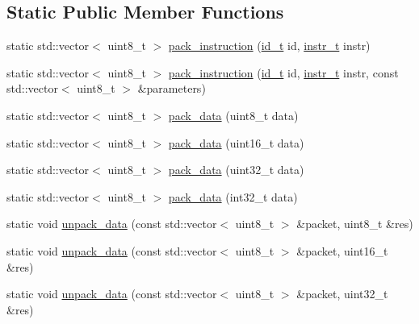 \subsection*{Static Public Member Functions}
\begin{DoxyCompactItemize}
\item 
static std\+::vector$<$ uint8\+\_\+t $>$ \hyperlink{classdynamixel_1_1protocols_1_1_protocol2_a552e41e1a1d4b09a9ecee8828b16054e}{pack\+\_\+instruction} (\hyperlink{classdynamixel_1_1protocols_1_1_protocol2_a38d9cae72cd86213cca74e718c240429}{id\+\_\+t} id, \hyperlink{classdynamixel_1_1protocols_1_1_protocol2_aa7302f20356607bd51e4d4ecf4cb7abf}{instr\+\_\+t} instr)
\item 
static std\+::vector$<$ uint8\+\_\+t $>$ \hyperlink{classdynamixel_1_1protocols_1_1_protocol2_aef8c539be7d18465064babd6071aa4d6}{pack\+\_\+instruction} (\hyperlink{classdynamixel_1_1protocols_1_1_protocol2_a38d9cae72cd86213cca74e718c240429}{id\+\_\+t} id, \hyperlink{classdynamixel_1_1protocols_1_1_protocol2_aa7302f20356607bd51e4d4ecf4cb7abf}{instr\+\_\+t} instr, const std\+::vector$<$ uint8\+\_\+t $>$ \&parameters)
\item 
static std\+::vector$<$ uint8\+\_\+t $>$ \hyperlink{classdynamixel_1_1protocols_1_1_protocol2_a6fb8c6abd45e66e76ba1095dda39fd43}{pack\+\_\+data} (uint8\+\_\+t data)
\item 
static std\+::vector$<$ uint8\+\_\+t $>$ \hyperlink{classdynamixel_1_1protocols_1_1_protocol2_ad32eb0deddb032c8ce2699c78226b27c}{pack\+\_\+data} (uint16\+\_\+t data)
\item 
static std\+::vector$<$ uint8\+\_\+t $>$ \hyperlink{classdynamixel_1_1protocols_1_1_protocol2_a0eb7e2bd3eae8762f35afeb41645dc24}{pack\+\_\+data} (uint32\+\_\+t data)
\item 
static std\+::vector$<$ uint8\+\_\+t $>$ \hyperlink{classdynamixel_1_1protocols_1_1_protocol2_a52d75d68d6a1e2e1128af0cf2cf22073}{pack\+\_\+data} (int32\+\_\+t data)
\item 
static void \hyperlink{classdynamixel_1_1protocols_1_1_protocol2_a8843f0f969caf4bedcc8eafea37988cf}{unpack\+\_\+data} (const std\+::vector$<$ uint8\+\_\+t $>$ \&packet, uint8\+\_\+t \&res)
\item 
static void \hyperlink{classdynamixel_1_1protocols_1_1_protocol2_ae411e8059b3a39500350da03dc4cdf9b}{unpack\+\_\+data} (const std\+::vector$<$ uint8\+\_\+t $>$ \&packet, uint16\+\_\+t \&res)
\item 
static void \hyperlink{classdynamixel_1_1protocols_1_1_protocol2_a9d1fc28953848b42e73a41012a78ad67}{unpack\+\_\+data} (const std\+::vector$<$ uint8\+\_\+t $>$ \&packet, uint32\+\_\+t \&res)

\end{DoxyCompactItemize}
